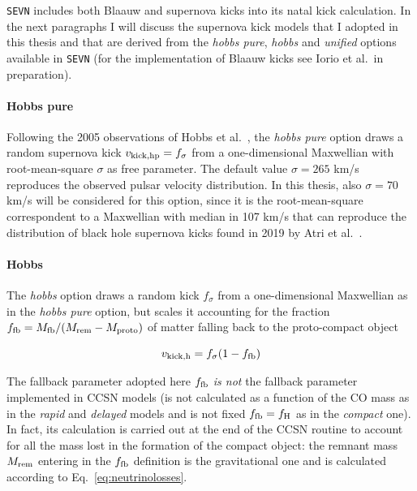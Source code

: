 \documentclass[a4paper,titlepage]{book}     	%
\begin{document}
\texttt{SEVN} includes both Blaauw and supernova kicks into its natal kick calculation. In the next paragraphs I will discuss the supernova kick models that I adopted in this thesis and that are derived from the \emph{hobbs pure}, \emph{hobbs} and \emph{unified} options available in \texttt{SEVN} (for the implementation of Blaauw kicks see Iorio et al.\ in preparation).


\paragraph{Hobbs pure } Following the 2005 observations of Hobbs et al.\ \cite{Hobbs2005}, the \emph{hobbs pure} option draws a random supernova kick $v_{\rm kick, hp} = f_{\sigma}$ from a one-dimensional Maxwellian with root-mean-square $\sigma$ as free parameter. The default value $\sigma = 265$ km/s reproduces the observed pulsar velocity distribution. In this thesis, also $\sigma = 70$ km/s will be considered for this option, since it is the root-mean-square correspondent to a Maxwellian with median in 107 km/s that can reproduce the distribution of black hole supernova kicks found in 2019 by Atri et al.\ \cite{Atri2019_kicks}.

\paragraph{Hobbs} The \emph{hobbs} option draws a random kick $f_{\sigma}$ from a one-dimensional Maxwellian as in the \emph{hobbs pure} option, but scales it accounting for the fraction $f_{\rm fb}=M_{\rm fb}/(M_{\rm rem} - M_{\rm proto})$ of matter falling back to the proto-compact object 

\begin{equation}\label{eq:kickhobbs}
    v_{\rm kick, h} = f_\sigma (1-f_{\rm fb}) 
\end{equation}

The fallback parameter adopted here $f_{\rm fb}$ \emph{is not} the fallback parameter implemented in CCSN models (is not calculated as a function of the CO mass as in the \emph{rapid} and \emph{delayed} models and is not fixed $f_{\rm fb} = f_{\rm H}$ as in the \emph{compact} one). In fact, its calculation is carried out at the end of the CCSN routine to account for all the mass lost in the formation of the compact object: the remnant mass $M_{\rm rem}$ entering in the $f_{\rm fb}$ definition is the gravitational one and is calculated according to Eq.\ \ref{eq:neutrinolosses}.\\
\end{document}
